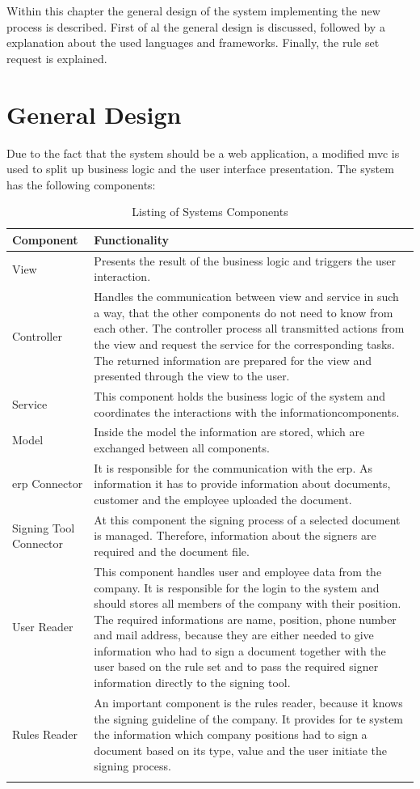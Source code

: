 Within this chapter the general design of the system implementing the new process is described. First of al the general design is discussed, followed by a explanation about the used languages and frameworks. Finally, the rule set request is explained. 

\section{General Design}
Due to the fact that the system should be a web application, a modified \gls{mvc} is used to split up business logic and the user interface presentation. The system has the following components:

	\begin{longtable}{|p{4cm}|p{11cm}|} \hline
		\rowcolor{Gray}Component & Functionality \\ \hline
		View & Presents the result of the  business logic and triggers the user interaction.\\ \hline
		Controller & Handles the communication between view and service in such a way, that the other components do not need to know from each other. The controller process all transmitted actions from the view and request the service for the corresponding tasks. The returned information are prepared for the view and presented through the view to the user. \\ \hline
		Service & This component holds the business logic of the system and coordinates the interactions with the \frqq information\flqq components. \\ \hline
		Model & Inside the model the information are stored, which are exchanged between all components.\\ \hline
		\Gls{erp} Connector & It is responsible for the communication with the \gls{erp}. As information it has to provide information about documents, customer and the employee uploaded the document. \\ \hline
		Signing Tool Connector & At this component the signing process of a selected document is managed. Therefore, information about the signers are required and the document file. \\ \hline
		User Reader & This component handles user and employee data from the company. It is responsible for the login to the system and should stores all members of the company with their position. The required informations are name, position, phone number and mail address, because they are either needed to give information who had to sign a document together with the user based on the rule set and to pass the required signer information directly to the signing tool. \\ \hline
		Rules Reader & An important component is the rules reader, because it knows the signing guideline of the company. It provides for te system the information which company positions had to sign a document based on its type, value and the user initiate the signing process.\\ \hline
		\caption{Listing of Systems Components}
		\label{tab:listingSystemComponents}
	\end{longtable}
